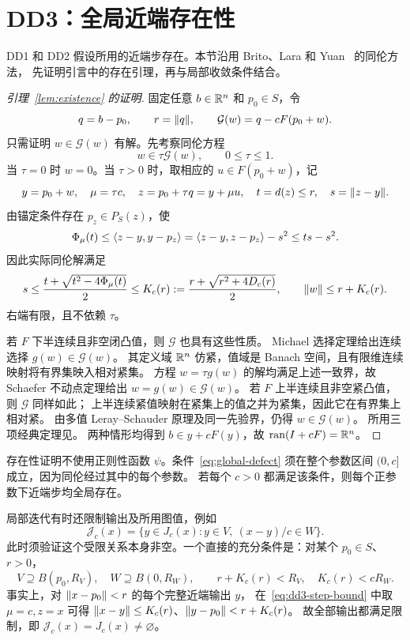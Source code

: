 \section{DD3：全局近端存在性}\label{sec:dd3}

DD1 和 DD2 假设所用的近端步存在。本节沿用
Brito、Lara 和 Yuan~\cite[定理~3.1]{BritoLaraYuan2026} 的同伦方法，
先证明引言中的存在引理，再与局部收敛条件结合。

\begin{proof}[引理~\ref{lem:existence} 的证明]
固定任意 $b\in\mathbb R^n$ 和 $p_0\in S$，令
\[
 q=b-p_0,\qquad r=\lVert q\rVert,\qquad \mathcal G(w)=q-cF(p_0+w).
\]
只需证明 $w\in\mathcal G(w)$ 有解。先考察同伦方程
\begin{equation}\label{eq:dd3-homotopy}
 w\in\tau\mathcal G(w),\qquad 0\le\tau\le1.
\end{equation}
当 $\tau=0$ 时 $w=0$。当 $\tau>0$ 时，取相应的 $u\in F(p_0+w)$，记
\[
 y=p_0+w,\quad \mu=\tau c,\quad z=p_0+\tau q=y+\mu u,
 \quad t=d(z)\le r,\quad s=\lVert z-y\rVert.
\]
由锚定条件存在 $p_z\in P_S(z)$，使
\[
 \Phi_\mu(t)\le\langle z-y,y-p_z\rangle
 =\langle z-y,z-p_z\rangle-s^2\le ts-s^2.
\]
因此实际同伦解满足
\begin{equation}\label{eq:dd3-step-bound}
 s\le\frac{t+\sqrt{t^2-4\Phi_\mu(t)}}2
 \le K_c(r):=\frac{r+\sqrt{r^2+4D_c(r)}}2,
 \qquad \lVert w\rVert\le r+K_c(r).
\end{equation}
右端有限，且不依赖 $\tau$。

若 $F$ 下半连续且非空闭凸值，则 $\mathcal G$ 也具有这些性质。
Michael 选择定理给出连续选择 $g(w)\in\mathcal G(w)$。
其定义域 $\mathbb R^n$ 仿紧，值域是 Banach 空间，且有限维连续映射将有界集映入相对紧集。
方程 $w=\tau g(w)$ 的解均满足上述一致界，故 Schaefer 不动点定理给出
$w=g(w)\in\mathcal G(w)$。
若 $F$ 上半连续且非空紧凸值，则 $\mathcal G$ 同样如此；
上半连续紧值映射在紧集上的值之并为紧集，因此它在有界集上相对紧。
由多值 Leray--Schauder 原理及同一先验界，仍得 $w\in\mathcal G(w)$。
所用三项经典定理见\cite[定理~2.5--2.7]{BritoLaraYuan2026}。
两种情形均得到 $b\in y+cF(y)$，故 $\operatorname{ran}(I+cF)=\mathbb R^n$。
\end{proof}

存在性证明不使用正则性函数 $\psi$。条件~\eqref{eq:global-defect}
须在整个参数区间 $(0,c]$ 成立，因为同伦经过其中的每个参数。
若每个 $c>0$ 都满足该条件，则每个正参数下近端步均全局存在。

局部迭代有时还限制输出及所用图值，例如
\begin{equation}\label{eq:dd3-allowed}
 \mathcal J_c(x)=\{y\in J_c(x):y\in V,\ (x-y)/c\in W\}.
\end{equation}
此时须验证这个受限关系本身非空。一个直接的充分条件是：对某个 $p_0\in S$、$r>0$，
\begin{equation}\label{eq:dd3-local-roots}
 V\supseteq B(p_0,R_V),\quad W\supseteq B(0,R_W),\qquad
 r+K_c(r)<R_V,\quad K_c(r)<cR_W.
\end{equation}
事实上，对 $\lVert x-p_0\rVert<r$ 的每个完整近端输出 $y$，
在~\eqref{eq:dd3-step-bound} 中取 $\mu=c,z=x$ 可得
$\lVert x-y\rVert\le K_c(r)$、$\lVert y-p_0\rVert<r+K_c(r)$。
故全部输出都满足限制，即 $\mathcal J_c(x)=J_c(x)\ne\varnothing$。

